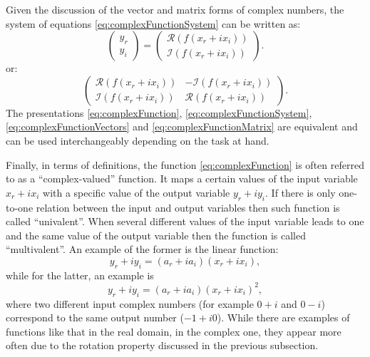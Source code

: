 \documentclass[
]{book}
\begin{document}
Given the discussion of the vector and matrix forms of complex numbers, the system of equations \eqref{eq:complexFunctionSystem} can be written as:
\begin{equation}
    \begin{pmatrix} y_r \\ y_i \end{pmatrix} =
    \begin{pmatrix} \mathcal{R}(f(x_r+ix_i)) \\ \mathcal{I}(f(x_r+ix_i)) \end{pmatrix} .
    \label{eq:complexFunctionVectors}
\end{equation}
or:
\begin{equation}
    \begin{pmatrix} \mathcal{R}(f(x_r+ix_i)) & - \mathcal{I}(f(x_r+ix_i)) \\ \mathcal{I}(f(x_r+ix_i)) & \mathcal{R}(f(x_r+ix_i)) \end{pmatrix} .
    \label{eq:complexFunctionMatrix}
\end{equation}
The presentations \eqref{eq:complexFunction}, \eqref{eq:complexFunctionSystem}, \eqref{eq:complexFunctionVectors} and \eqref{eq:complexFunctionMatrix} are equivalent and can be used interchangeably depending on the task at hand.

Finally, in terms of definitions, the function \eqref{eq:complexFunction} is often referred to as a ``complex-valued'' function. It maps a certain values of the input variable \(x_r + i x_i\) with a specific value of the output variable \(y_r +i y_i\). If there is only one-to-one relation between the input and output variables then such function is called ``univalent''. When several different values of the input variable leads to one and the same value of the output variable then the function is called ``multivalent''. An example of the former is the linear function:
\begin{equation*}
    y_r + i y_i = (a_{r} + i a_{i}) (x_{r} + i x_{i}),
\end{equation*}
while for the latter, an example is
\begin{equation*}
    y_r + i y_i = (a_{r} + i a_{i}) (x_{r} + i x_{i})^2, 
\end{equation*}
where two different input complex numbers (for example \(0 + i\) and \(0-i\)) correspond to the same output number (\(-1 + i0\)). While there are examples of functions like that in the real domain, in the complex one, they appear more often due to the rotation property discussed in the previous subsection.
\end{document}
